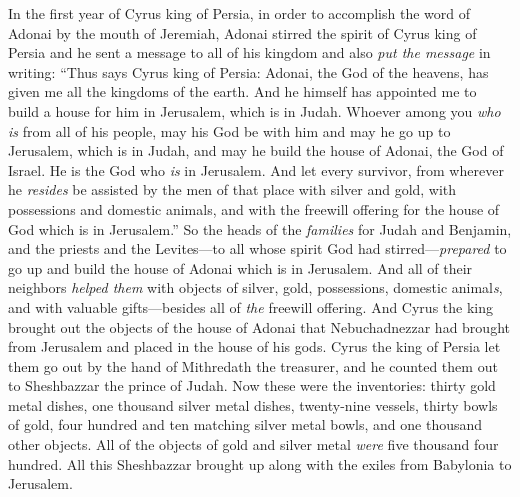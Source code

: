 
\begin{biblechapter} %
 In the first year of Cyrus king of Persia, in order to accomplish the word of Adonai by the mouth of Jeremiah, Adonai stirred the spirit of Cyrus king of Persia and he sent a message to all of his kingdom and also \textit{put the message} in writing:
\verse “Thus says Cyrus king of Persia: Adonai, the God of the heavens, has given me all the kingdoms of the earth. And he himself has appointed me to build a house for him in Jerusalem, which is in Judah.
\verse Whoever among you \textit{who is} from all of his people, may his God be with him and may he go up to Jerusalem, which is in Judah, and may he build the house of Adonai, the God of Israel. He is the God who \textit{is} in Jerusalem.
\verse And let every survivor, from wherever he \textit{resides} be assisted by the men of that place with silver and gold, with possessions and domestic animals, and with the freewill offering for the house of God which is in Jerusalem.”
\verse So the heads of the \textit{families} for Judah and Benjamin, and the priests and the Levites—to all whose spirit God had stirred—\textit{prepared} to go up and build the house of Adonai which is in Jerusalem.
\verse And all of their neighbors \textit{helped them} with objects of silver, gold, possessions, domestic animal\textit{s}, and with valuable gifts—besides all of \textit{the} freewill offering.
\verse And Cyrus the king brought out the objects of the house of Adonai that Nebuchadnezzar had brought from Jerusalem and placed in the house of his gods.
\verse Cyrus the king of Persia let them go out by the hand of Mithredath the treasurer, and he counted them out to Sheshbazzar the prince of Judah.
\verse Now these were the inventories: thirty gold metal dishes, one thousand silver metal dishes, twenty-nine vessels,
\verse thirty bowls of gold, four hundred and ten matching silver metal bowls, and one thousand other objects.
\verse All of the objects of gold and silver metal \textit{were} five thousand four hundred. All this Sheshbazzar brought up along with the exiles from Babylonia to Jerusalem.
\end{biblechapter}

